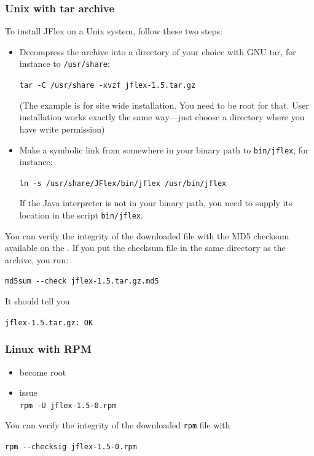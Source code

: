 \documentclass[11pt]{scrartcl}
\newcommand{\ver}{1.5}
\begin{document}
\subsubsection{Unix with tar archive}

To install JFlex on a Unix system, follow these two steps:
\begin{itemize}
\item
  Decompress the archive into a directory of your choice
  with GNU tar, for instance to \texttt{/usr/share}:

  \texttt{tar -C /usr/share -xvzf jflex-\ver.tar.gz}
  
  (The example is for site wide installation. You need to
  be root for that. User installation works exactly the
  same way---just choose a directory where you have write
  permission)

\item
  Make a symbolic link from somewhere in your binary 
  path to \texttt{bin/jflex}, for instance:

  \texttt{ln -s /usr/share/JFlex/bin/jflex /usr/bin/jflex}

  If the Java interpreter is not in your binary path, you
  need to supply its location in the script \texttt{bin/jflex}.
\end{itemize}

You can verify the integrity of the downloaded file with
the MD5 checksum available on the . 
If you put the checksum file in the same directory
as the archive, you run:

\verb+md5sum --check +\texttt{jflex-\ver.tar.gz.md5}

It should tell you

\texttt{jflex-\ver.tar.gz: OK}

\subsubsection{Linux with RPM}

\begin{itemize}
\item
  become root
\item issue\\
  \texttt{rpm -U jflex-\ver-0.rpm}
\end{itemize}

You can verify the integrity of the downloaded \texttt{rpm} file with

\verb+rpm --checksig +\texttt{jflex-\ver-0.rpm}
\end{document}
